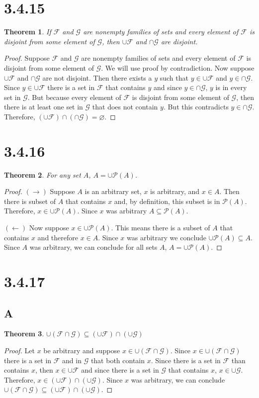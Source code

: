 \documentclass{article}
\newcommand{\F}{\mathcal{F}}
\newcommand{\G}{\mathcal{G}}
\newcommand{\pwset}{\mathscr{P}}
\newtheorem*{theorem}{Theorem}  %
\begin{document}
\section*{3.4.15}
\begin{theorem}If $\F$ and $\G$ are nonempty families of sets and every element of $\F$ is disjoint from some element of $\G$, then $\cup \F$ and $\cap \G$ are disjoint.
\end{theorem}
\begin{proof}
Suppose $\F$ and $\G$ are nonempty families of sets and every element of $\F$ is disjoint from some element of $\G$. We will use proof by contradiction. Now suppose $\cup \F$ and $\cap \G$ are not disjoint. Then there exists a $y$ such that $y \in \cup \F$ and $y \in \cap \G$. Since $y \in \cup \F$ there is a set in $\F$ that contains $y$ and since $y \in \cap \G$, $y$ is in every set in $\G$. But because every element of $\F$ is disjoint from some element of $\G$, then there is at least one set in $\G$ that does not contain $y$. But this contradicts $y \in \cap \G$. Therefore, $(\cup \F) \cap (\cap \G) = \varnothing$. 
\end{proof}

\section*{3.4.16}
\begin{theorem} For any set $A$, $A = \cup \pwset(A)$.
\end{theorem}
\begin{proof}
$(\rightarrow)$ Suppose $A$ is an arbitrary set, $x$ is arbitrary, and $x \in A$. Then there is subset of $A$ that contains $x$ and, by definition, this subset is in $\pwset(A)$. Therefore, $x \in \cup \pwset(A)$. Since $x$ was arbitrary $A \subseteq \pwset(A)$.

$(\leftarrow)$ Now suppose $x \in \cup \pwset(A)$. This means there is a subset of $A$ that contains $x$ and therefore $x \in A$. Since $x$ was arbitrary we conclude $\cup \pwset(A) \subseteq A$. Since $A$ was arbitrary, we can conclude for all sets $A$, $A = \cup \pwset(A)$. 
\end{proof}

\section*{3.4.17}
\subsection*{A}
\begin{theorem} $\cup ( \F \cap \G) \subseteq (\cup \F) \cap (\cup \G)$
\end{theorem}
\begin{proof}
Let $x$ be arbitrary and suppose $x \in \cup (\F \cap \G)$. Since $x \in \cup (\F \cap \G)$ there is a set in $\F$ and in $\G$ that both contain $x$. Since there is a set in $\F$ than contains $x$, then $x \in \cup \F$ and since there is a set in $\G$ that contains $x$, $x \in \cup \G$. Therefore, $x \in (\cup \F) \cap (\cup \G)$. Since $x$ was arbitrary, we can conclude $\cup (\F \cap \G) \subseteq (\cup \F) \cap (\cup \G)$.
\end{proof}
\end{document}
